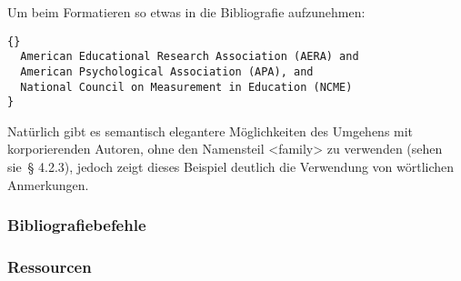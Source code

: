 \documentclass{ltxdockit}[2011/03/25]
\begin{document}
\begin{ltxexample}[style=latex]
\renewcommand*{\mkbibnamefamily}[1]{%
  #1\space\mkbibparens{\getpartannotation{family}}}
\end{ltxexample}
%
Um beim Formatieren so etwas in die Bibliografie aufzunehmen:

\begin{lstlisting}[style=bibtex]{}
  American Educational Research Association (AERA) and
  American Psychological Association (APA), and
  National Council on Measurement in Education (NCME)
}
\end{lstlisting}
%
Natürlich gibt es semantisch elegantere Möglichkeiten des Umgehens mit korporierenden
Autoren, ohne den Namensteil <family> zu verwenden (sehen sie~§ 4.2.3), %
jedoch zeigt dieses Beispiel deutlich die Verwendung von wörtlichen Anmerkungen.

\subsubsection{Bibliografiebefehle} \label{use:bib}

\subsubsection{Ressourcen} \label{use:bib:res}
\end{document}
